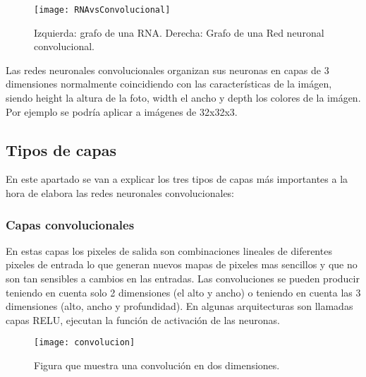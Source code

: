 \begin{figure}[h]
    \begin{center}%
        \begin{center}%
          \texttt{[image: RNAvsConvolucional]}%
          \caption{Izquierda: grafo de una RNA. Derecha: Grafo de una Red neuronal convolucional.}%
          \label{figRNAvsConvolucional}%
        \end{center}%
  	\end{center}%
\end{figure}%

Las redes neuronales convolucionales organizan sus neuronas en capas de 3 dimensiones normalmente coincidiendo con las características de la imágen, siendo height la altura de la foto, width el ancho y depth los colores de la imágen. Por ejemplo se podría aplicar a imágenes de 32x32x3.

\subsection{Tipos de capas}

En este apartado se van a explicar los tres tipos de capas más importantes a la hora de elabora las redes neuronales convolucionales:
\subsubsection{Capas convolucionales}

En estas capas los pixeles de salida son combinaciones lineales de diferentes pixeles de entrada lo que generan nuevos mapas de pixeles mas sencillos y que no son tan sensibles a cambios en las entradas.\cite{redesConvolucionales} Las convoluciones se pueden producir teniendo en cuenta solo 2 dimensiones (el alto y ancho) o teniendo en cuenta las 3 dimensiones (alto, ancho y profundidad). En algunas arquitecturas son llamadas capas RELU, ejecutan la función de activación de las neuronas.

\begin{figure}[h]
    \begin{center}%
        \begin{center}%
          \texttt{[image: convolucion]}%
          \caption{Figura que muestra una convolución en dos dimensiones.}%
          \label{figconvolucion}%
        \end{center}%
  	\end{center}%
\end{figure}%
 
